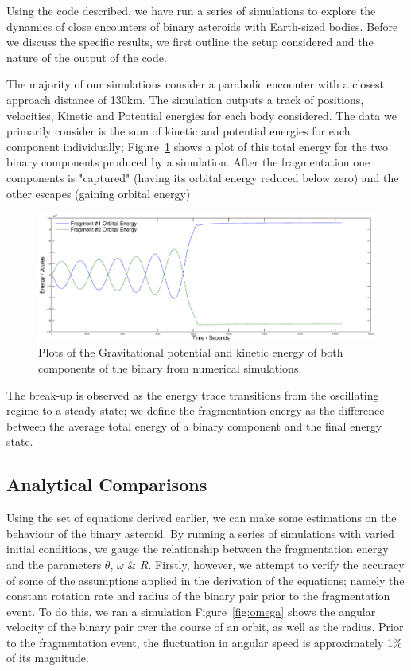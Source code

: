 \documentclass[letterpaper, preprint, paper,11pt]{AAS}	%
\begin{document}
Using the code described, we have run a series of simulations to explore the dynamics of close encounters of binary asteroids with Earth-sized bodies. Before we discuss the specific results, we first outline the setup considered and the nature of the output of the code.

The majority of our simulations consider a parabolic encounter with a closest approach distance of 130km. The simulation outputs a track of positions, velocities, Kinetic and Potential energies for each body considered. The data we primarily consider is the sum of kinetic and potential energies for each component individually;  Figure~\ref{fig:Num} shows a plot of this total energy for the two binary components produced by a simulation. After the fragmentation one components is "captured" (having its orbital energy reduced below zero) and the other escapes (gaining orbital energy)
\begin{figure}[H]
\centering
\centerline{\includegraphics[width=1.2\textwidth]{binary_num.eps}} 
\caption{Plots of the Gravitational potential and kinetic energy of both components of the binary from numerical simulations.} 
\label{fig:Num}
\end{figure}
The break-up is observed as the energy trace transitions from the oscillating regime to a steady state; we define the fragmentation energy as the difference between the average total energy of a binary component and the final energy state.  

\subsection{Analytical Comparisons}

Using the set of equations derived earlier, we can make some estimations on the behaviour of the binary asteroid. By running a series of simulations with varied initial conditions, we gauge the relationship between the fragmentation energy and the parameters $\theta$, $\omega$ \& $R$. Firstly, however, we attempt to verify the accuracy of some of the assumptions applied in the derivation of the equations; namely the constant rotation rate and radius of the binary pair prior to the fragmentation event. To do this, we ran a simulation Figure~\ref{fig:omega} shows the angular velocity of the binary pair over the course of an orbit, as well as the radius. Prior to the fragmentation event, the fluctuation in angular speed is approximately 1\% of its magnitude.
\end{document}

